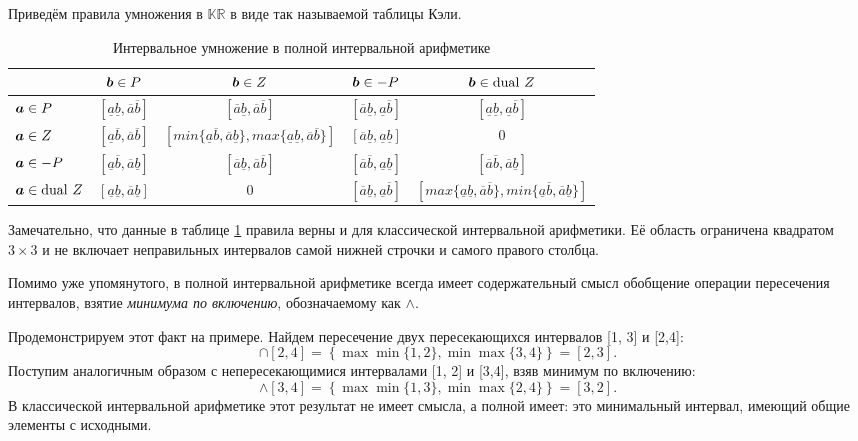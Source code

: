 \documentclass[a5paper,openany]{book}
\newcommand{\mbf}[1]{\protect\text{\boldmath$#1$}}
\newcommand{\ov}{\overline}
\newcommand{\un}{\underline}
\begin{document}
Приведём правила умножения в $\mathbb{KR}$ в виде так называемой таблицы Кэли.
\begin {table}[h]
\begin{small}
\begin{center}
	\begin{tabular}{l | c c c | c}
		& $\mbf{b} \in P $ & $\mbf{b} \in Z$ & $\mbf{b} \in -P$ & $\mbf{b} \in \mathrm{dual} \ Z $ \\	
		\hline	
		$\mbf{a} \in P$  & $ [\un{a}  \un{b}, \ov{a} \ov{b}] $ & $ [\ov{a}  \un{b}, \ov{a} \ov{b}] $ & $[ \ov{a} \un{b} ,\un{a}  \ov{b}] $ & $ [\un{a}  \un{b}, \un{a} \ov{b}] $\\
		$\mbf{a} \in Z$ & $ [\un{a}  \ov{b}, \ov{a} \ov{b}] $& $[min \{\un{a}  \ov{b}, \ov{a} \un{b} \}, max\{ \un{a}  \un{b}, \ov{a} \ov{b} \}] $ & $[ \ov{a} \un{b} , \un{a}  \un{b}] $ & 0 \\
		$\mbf{a} \in -P$ & $[\un{a}  \ov{b}, \ov{a} \un{b}] $& $[\ov{a}  \un{b}, \ov{a} \ov{b}] $ & $ [ \ov{a} \ov{b}, \un{a}  \un{b} ] $ & $ [ \ov{a} \ov{b}, \ov{a}  \un{b} ] $\\
			\hline	
		$\mbf{a} \in \mathrm{dual} \ Z $ & $ [\un{a}  \un{b}, \ov{a} \un{b}] $ & 0 & $[ \ov{a} \un{b} , \un{a}  \ov{b}] $ & $[max \{\un{a}  \un{b}, \ov{a} \ov{b} \}, min\{ \un{a}  \ov{b}, \ov{a} \un{b} \}] $
	\end{tabular} 
\end{center}
\end{small}
\caption{Интервальное умножение в полной интервальной арифметике}  
\label{t:CayleyKR}
\end{table}

Замечательно, что данные в таблице \ref{t:CayleyKR} правила верны и для классической интервальной арифметики. Её область ограничена квадратом $3 \times 3$ и не включает неправильных интервалов самой нижней строчки и самого правого столбца.


Помимо уже упомянутого, в полной интервальной арифметике всегда имеет содержательный смысл обобщение операции пересечения интервалов, взятие \emph{минимума по включению}, обозначаемому как $\wedge$. 

Продемонстрируем этот факт на примере. Найдем пересечение двух пересекающихся интервалов [1, 3] и [2,4]:
\begin{equation*}
[1, 3] \cap [2,4] = \left\lbrace \max \min \{1,2\}, \min \max \{3,4 \}  \right\rbrace   = [2,3].
\end{equation*}
Поступим аналогичным образом с непересекающимися интервалами [1, 2] и [3,4], взяв минимум по включению:
\begin{equation*}
[1, 2] \wedge [3,4] = \left\lbrace \max \min \{1,3\}, \min \max \{2,4 \}  \right\rbrace   = [3,2].
\end{equation*}
В классической интервальной арифметике этот результат не имеет смысла, а полной имеет: это минимальный интервал, имеющий общие элементы с исходными.
\end{document}
